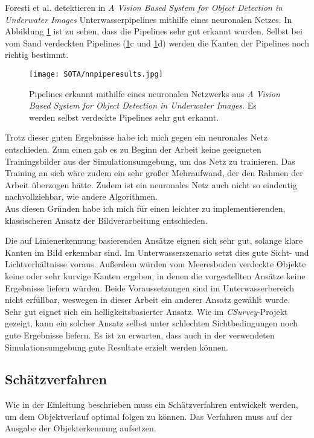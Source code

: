 Foresti et al. detektieren in \textit{A Vision Based System for Object Detection in
Underwater Images}\cite{foresti2000vision} Unterwasserpipelines mithilfe eines neuronalen Netzes. In Abbildung \ref{nnDet} ist zu sehen, dass die Pipelines sehr gut erkannt wurden. Selbst bei vom Sand verdeckten Pipelines (\ref{nnDet}c und \ref{nnDet}d) werden die Kanten der Pipelines noch richtig bestimmt.

\begin{figure}[H]
\centering
\texttt{[image: SOTA/nnpiperesults.jpg]}
\caption[Pipelinedetektion mit neuronalem Netzwerk.]{Pipelines erkannt mithilfe eines neuronalen Netzwerks aus \textit{A Vision Based System for Object Detection in Underwater Images}\cite{foresti2000vision}. Es werden selbst verdeckte Pipelines sehr gut erkannt.}
\label{nnDet}
\end{figure}
Trotz dieser guten Ergebnisse habe ich mich gegen ein neuronales Netz entschieden. Zum einen gab es zu Beginn der Arbeit keine geeigneten Trainingsbilder aus der Simulationsumgebung, um das Netz zu trainieren. Das Training an sich wäre zudem ein sehr großer Mehraufwand, der den Rahmen der Arbeit überzogen hätte. Zudem ist ein neuronales Netz auch nicht so eindeutig nachvollziehbar, wie andere Algorithmen.\\
Aus diesen Gründen habe ich mich für einen leichter zu implementierenden, klassischeren Ansatz der Bildverarbeitung entschieden.

Die auf Linienerkennung basierenden Ansätze eignen sich sehr gut, solange klare Kanten im Bild erkennbar sind. Im Unterwasserszenario setzt dies gute Sicht- und Lichtverhältnisse voraus. Außerdem würden vom Meeresboden verdeckte Objekte keine oder sehr kurvige Kanten ergeben, in denen die vorgestellten Ansätze keine Ergebnisse liefern würden. Beide Voraussetzungen sind im Unterwasserbereich nicht erfüllbar, weswegen in dieser Arbeit ein anderer Ansatz gewählt wurde.\\
Sehr gut eignet sich ein helligkeitsbasierter Ansatz. Wie im \textit{CSurvey}-Projekt\cite{Albiez2015CSurveyA} gezeigt, kann ein solcher Ansatz selbst unter schlechten Sichtbedingungen noch gute Ergebnisse liefern. Es ist zu erwarten, dass auch in der verwendeten Simulationsumgebung gute Resultate erzielt werden können.\\
\subsection{Schätzverfahren}
Wie in der Einleitung beschrieben muss ein Schätzverfahren entwickelt werden, um dem Objektverlauf optimal folgen zu können. Das Verfahren muss auf der Ausgabe der Objekterkennung aufsetzen.
